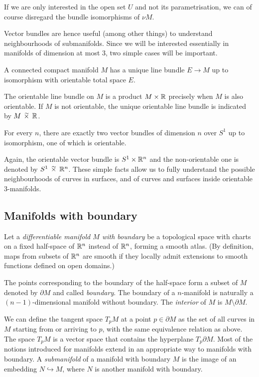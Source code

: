 If we are only interested in the open set $U$ and not its parametrisation, we can of course disregard the bundle isomorphisms of $\nu M$.

Vector bundles are hence useful (among other things) to understand neighbourhoods of submanifolds. Since we will be interested essentially in manifolds of dimension at most 3, two simple cases will be important.

\begin{prop} \label{unique:line:bundle:prop}
A connected compact manifold $M$ has a unique line bundle $E\to M$ up to isomorphism with orientable total space $E$.
\end{prop}

The orientable line bundle on $M$ is a product $M\times \mathbb{R}$ precisely when $M$ is also orientable. If $M$ is not orientable, the unique orientable line bundle is indicated by $M \timtil \matR$.

\begin{prop} \label{S1:bundle:prop}
For every $n$, there are exactly two vector bundles of dimension $n$ over $S^1$ up to isomorphism, one of which is orientable.
\end{prop}

Again, the orientable vector bundle is $S^1 \times \mathbb{R}^n $ and the non-orientable one is denoted by $S^1 \timtil \matR^n$. These simple facts allow us to fully understand the possible neighbourhoods of curves in surfaces, and of curves and surfaces inside orientable 3-manifolds. 

\subsection{Manifolds with boundary}
Let a \emph{differentiable manifold $M$ with boundary} be a topological space with charts on a fixed half-space of $\mathbb{R}^n$ instead of $\mathbb{R}^n$, forming a smooth atlas. (By definition, maps from subsets of $\mathbb{R}^n$ are smooth if they locally admit extensions to smooth functions defined on open domains.) 

The points corresponding to the boundary of the half-space form a subset of $M$ denoted by $\partial M$ and called \emph{boundary}. The boundary of a $n$-manifold is naturally a $(n-1)$-dimensional manifold without boundary. The \emph{interior} of $M$ is $M\setminus \partial M$.

We can define the tangent space $T_pM$ at a point $p\in \partial M$ as the set of all curves in $M$ starting from or arriving to $p$, with the same equivalence relation as above. The space $T_pM$ is a vector space that contains the hyperplane $T_p \partial M$. Most of the notions introduced for manifolds extend in an appropriate way to manifolds with boundary. A \emph{submanifold} of a manifold with boundary $M$ is the image of an embedding $N \hookrightarrow M$, where $N$ is another manifold with boundary.


